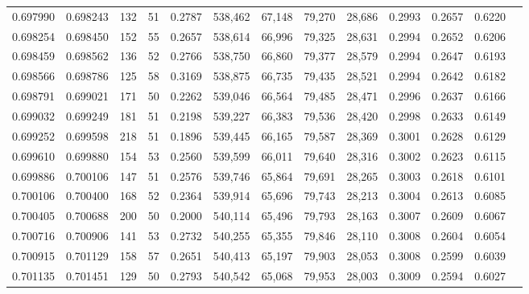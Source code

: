 \begin{tabular}{rrrrrrrrrrrrr}
0.697990 & 0.698243 &   132 &  51 &                                     0.2787 & 538,462 &  67,148 &  79,270 &  28,686 & 0.2993 & 0.2657 & 0.6220 \\
0.698254 & 0.698450 &   152 &  55 &                                     0.2657 & 538,614 &  66,996 &  79,325 &  28,631 & 0.2994 & 0.2652 & 0.6206 \\
0.698459 & 0.698562 &   136 &  52 &                                     0.2766 & 538,750 &  66,860 &  79,377 &  28,579 & 0.2994 & 0.2647 & 0.6193 \\
0.698566 & 0.698786 &   125 &  58 &                                     0.3169 & 538,875 &  66,735 &  79,435 &  28,521 & 0.2994 & 0.2642 & 0.6182 \\
0.698791 & 0.699021 &   171 &  50 &                                     0.2262 & 539,046 &  66,564 &  79,485 &  28,471 & 0.2996 & 0.2637 & 0.6166 \\
0.699032 & 0.699249 &   181 &  51 &                                     0.2198 & 539,227 &  66,383 &  79,536 &  28,420 & 0.2998 & 0.2633 & 0.6149 \\
0.699252 & 0.699598 &   218 &  51 &                                     0.1896 & 539,445 &  66,165 &  79,587 &  28,369 & 0.3001 & 0.2628 & 0.6129 \\
0.699610 & 0.699880 &   154 &  53 &                                     0.2560 & 539,599 &  66,011 &  79,640 &  28,316 & 0.3002 & 0.2623 & 0.6115 \\
0.699886 & 0.700106 &   147 &  51 &                                     0.2576 & 539,746 &  65,864 &  79,691 &  28,265 & 0.3003 & 0.2618 & 0.6101 \\
0.700106 & 0.700400 &   168 &  52 &                                     0.2364 & 539,914 &  65,696 &  79,743 &  28,213 & 0.3004 & 0.2613 & 0.6085 \\
0.700405 & 0.700688 &   200 &  50 &                                     0.2000 & 540,114 &  65,496 &  79,793 &  28,163 & 0.3007 & 0.2609 & 0.6067 \\
0.700716 & 0.700906 &   141 &  53 &                                     0.2732 & 540,255 &  65,355 &  79,846 &  28,110 & 0.3008 & 0.2604 & 0.6054 \\
0.700915 & 0.701129 &   158 &  57 &                                     0.2651 & 540,413 &  65,197 &  79,903 &  28,053 & 0.3008 & 0.2599 & 0.6039 \\
0.701135 & 0.701451 &   129 &  50 &                                     0.2793 & 540,542 &  65,068 &  79,953 &  28,003 & 0.3009 & 0.2594 & 0.6027 \\

\end{tabular}
